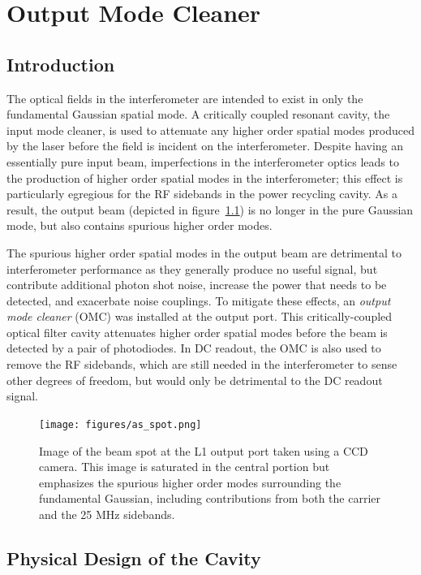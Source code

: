 \chapter{Output Mode Cleaner}
\label{chapter4}
\section{Introduction}

The optical fields in the interferometer are intended to exist in only
the fundamental Gaussian spatial mode.  A critically coupled resonant
cavity, the input mode cleaner, is used to attenuate any higher order
spatial modes produced by the laser before the field is incident on
the interferometer.  Despite having an essentially pure input beam,
imperfections in the interferometer optics leads to the production of
higher order spatial modes in the interferometer; this effect is
particularly egregious for the RF sidebands in the power recycling
cavity\cite{Gretarsson2007Effects}.  As a result, the output beam
(depicted in figure~\ref{fig:as-spot}) is no longer in the pure
Gaussian mode, but also contains spurious higher order modes.

The spurious higher order spatial modes in the output beam are
detrimental to interferometer performance as they generally produce no
useful signal, but contribute additional photon shot noise, increase
the power that needs to be detected, and exacerbate noise couplings.
To mitigate these effects, an \emph{output mode cleaner} (OMC) was
installed at the output port.  This critically-coupled optical filter
cavity attenuates higher order spatial modes before the beam is
detected by a pair of photodiodes.  In DC readout, the OMC is also
used to remove the RF sidebands, which are still needed in the
interferometer to sense other degrees of freedom, but would only be
detrimental to the DC readout signal.

\begin{figure}[t]
\centerline{\texttt{[image: figures/as\_spot.png]}}
\caption[Beam spot at the interferometer output port]{
\label{fig:as-spot}Image of the beam spot at the L1 output
  port taken using a CCD camera.  This image is saturated in the
  central portion but emphasizes the spurious higher order modes
  surrounding the fundamental Gaussian, including contributions
  from both the carrier and the 25 MHz sidebands.}
\end{figure}

\section{Physical Design of the Cavity}

